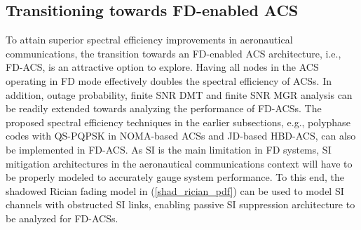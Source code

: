 \subsection{Transitioning towards FD-enabled ACS}
To attain superior spectral efficiency improvements in aeronautical communications, the transition towards an FD-enabled ACS architecture, i.e., FD-ACS, is an attractive option to explore. Having all nodes in the ACS operating in FD mode effectively doubles the spectral efficiency of ACSs. In addition, outage probability, finite SNR DMT and finite SNR MGR analysis can be readily extended towards analyzing the performance of FD-ACSs. The proposed spectral efficiency techniques in the earlier subsections, e.g., polyphase codes with QS-PQPSK in NOMA-based ACSs and JD-based HBD-ACS, can also be implemented in FD-ACS. As SI is the main limitation in FD systems, SI mitigation architectures in the aeronautical communications context will have to be properly modeled to accurately gauge system performance. To this end, the shadowed Rician fading model in (\ref{shad_rician_pdf}) can be used to model SI channels with obstructed SI links, enabling passive SI suppression architecture to be analyzed for FD-ACSs.








